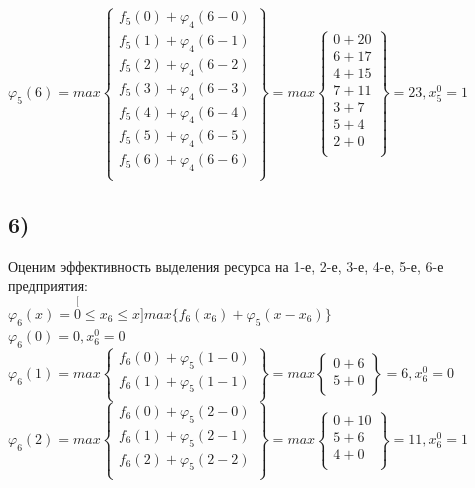 $\varphi_5(6) = max \begin{Bmatrix}
    f_5(0) + \varphi_4(6 - 0) \\
    f_5(1) + \varphi_4(6 - 1) \\
    f_5(2) + \varphi_4(6 - 2) \\
    f_5(3) + \varphi_4(6 - 3) \\
    f_5(4) + \varphi_4(6 - 4) \\
    f_5(5) + \varphi_4(6 - 5) \\
    f_5(6) + \varphi_4(6 - 6) \\
\end{Bmatrix} = max \begin{Bmatrix}
    0 + 20 \\
    6 + 17 \\
    4 + 15 \\
    7 + 11 \\
    3 + 7 \\
    5 + 4 \\
    2 + 0 \\
\end{Bmatrix} = 23, x_5^0 = 1$\\


\subsection*{6)} Оценим эффективность выделения ресурса на 1-е, 2-е, 3-е, 4-е, 5-е, 6-е предприятия:\\
$\varphi_6(x) = \stackrel[0 \le x_6 \le x]{}{max}  \{f_6(x_6) + \varphi_5(x - x_6)\}$\\

$\varphi_6(0) = 0, x_6^0 = 0$\\

$\varphi_6(1) = max \begin{Bmatrix}
    f_6(0) + \varphi_5(1 - 0) \\
    f_6(1) + \varphi_5(1 - 1) \\
\end{Bmatrix} = max \begin{Bmatrix}
    0 + 6 \\
    5 + 0 \\
\end{Bmatrix} = 6, x_6^0 = 0$\\

$\varphi_6(2) = max \begin{Bmatrix}
    f_6(0) + \varphi_5(2 - 0) \\
    f_6(1) + \varphi_5(2 - 1) \\
    f_6(2) + \varphi_5(2 - 2) \\
\end{Bmatrix} = max \begin{Bmatrix}
    0 + 10 \\
    5 + 6 \\
    4 + 0 \\
\end{Bmatrix} = 11, x_6^0 = 1$\\

